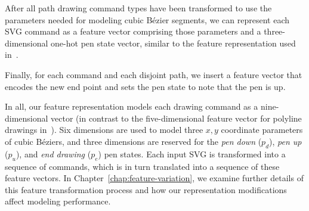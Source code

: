 After all path drawing command types have been transformed to use the parameters needed for modeling cubic B\'ezier segments, we can represent each SVG command as a feature vector comprising those parameters and a three-dimensional one-hot pen state vector, similar to the feature representation used in~\cite{ha2017neural}.

Finally, for each  command and each disjoint path, we insert a feature vector that encodes the new end point and sets the pen state to note that the pen is up.

In all, our feature representation models each drawing command as a nine-dimensional vector (in contrast to the five-dimensional feature vector for polyline drawings in~\cite{ha2017neural}).
Six dimensions are used to model three $x, y$ coordinate parameters of cubic B\'eziers, and three dimensions are reserved for the \textit{pen down} ($p_d$), \textit{pen up} ($p_u$), and \textit{end drawing} ($p_e$) pen states.
Each input SVG is transformed into a sequence of commands, which is in turn translated into a sequence of these feature vectors.
In Chapter~\ref{chap:feature-variation}, we examine further details of this feature transformation process and how our representation modifications affect modeling performance.
